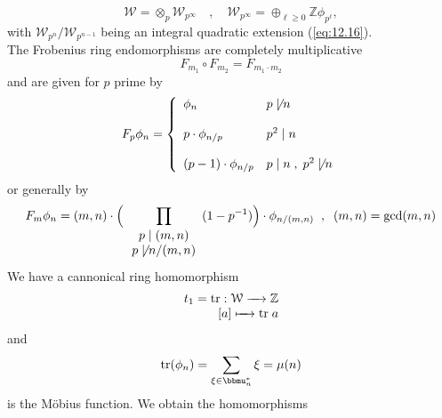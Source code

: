 \documentclass[leqno]{article}
\newcommand{\Z}{\mathbb{Z}}
\numberwithin{equation}{section}
\begin{document}
        \begin{equation}
          \label{eq:12.18}
          \mathcal{W} = \otimes_p \mathcal{W}_{p^\infty} \quad , \quad \mathcal{W}_{p^\infty}=\oplus_{\ell\geq 0}\Z \phi_{p^\ell},
        \end{equation}
        with $\mathcal{W}_{p^n}/\mathcal{W}_{p^{n-1}}$ being an integral quadratic extension  (\ref{eq:12.16}). \\
        The Frobenius ring endomorphisms are  completely multiplicative
        \begin{equation}
          \label{eq:2.19}
          F_{m_1}\circ F_{m_2}= F_{m_1\cdot m_2}
        \end{equation}
        and are given for $p$ prime by
        \begin{equation}
          \label{eq:12.20}
          F_p\phi_{n}= \left\{
          \begin{array}[h]{ll}
            \phi_n &  p \not\mid n \\\\
            p\cdot \phi_{n/p} & p^2\mid n \\\\
            (p-1)\cdot \phi _{n/p} & p\mid n \; , \; p^2\not\mid n
          \end{array}\right.
      \end{equation}
      or generally by
      \begin{equation}
        \label{eq:12.21}
        F_m\phi_n= (m,n)\cdot \Big( \prod\limits_{\begin{array}[h]{c}p\mid (m,n) \\ p \not\mid n/(m,n)\end{array}}(1-p^{-1})\Big) \cdot \phi_{n/(m,n)}\;\; , \;\; (m,n)=\gcd(m,n)
      \end{equation}
      We have a cannonical ring homomorphism
      \begin{equation}
        \label{eq:12.22}
          \begin{array}[h]{r}
            t_1=\text{tr}: \mathcal{W}\xrightarrow{\quad}{} \Z \\
           \text{$[a]$} \xmapsto{\quad}{} \text{tr}\; a
          \end{array}
        \end{equation}
        and
        \begin{equation}
          \label{eq:12.23}
          \text{tr}(\phi_n) = \sum_{\xi\in\bbmu_n^{\ast}}\xi=\mu(n)
        \end{equation}
is the M\"obius function. We obtain the homomorphisms
\end{document}
